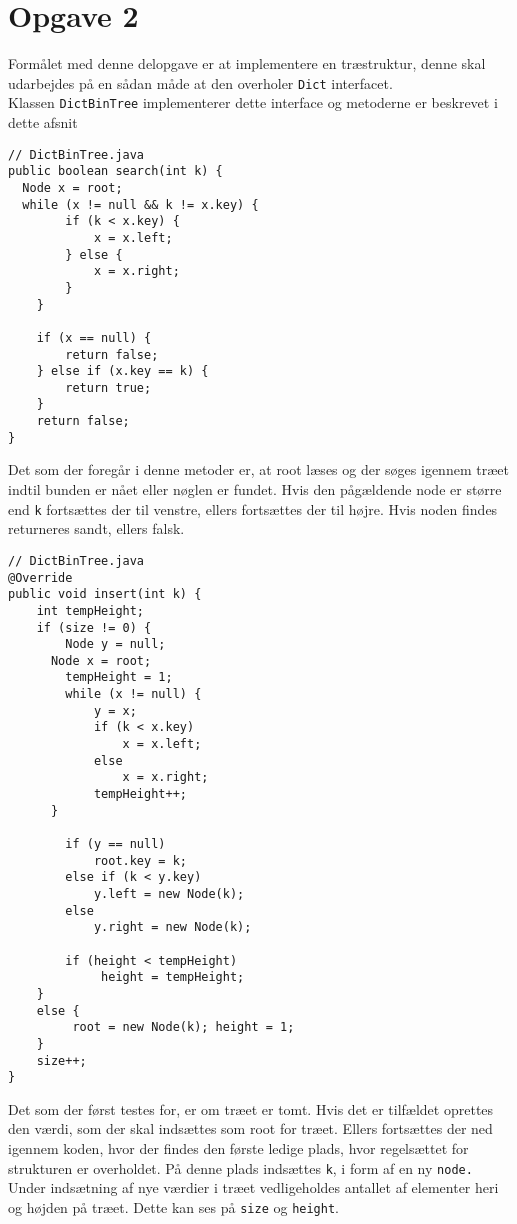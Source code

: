 \documentclass{article}
\begin{document}
\section*{Opgave 2}
Formålet med denne delopgave er at implementere en træstruktur, denne skal udarbejdes på en sådan måde at den overholer \texttt{Dict} interfacet.\\
Klassen \texttt{DictBinTree} implementerer dette interface og metoderne er beskrevet i dette afsnit
\begin{lstlisting}
// DictBinTree.java
public boolean search(int k) {
  Node x = root;
  while (x != null && k != x.key) {
        if (k < x.key) {
            x = x.left;
        } else {
            x = x.right;
        }
    }

    if (x == null) {
        return false;
    } else if (x.key == k) {
        return true;
    }
    return false;
}
\end{lstlisting}
\bigskip
Det som der foregår i denne metoder er, at root læses og der søges igennem træet indtil bunden er nået eller nøglen er fundet. Hvis den pågældende node er større end \texttt{k} fortsættes der til venstre, ellers fortsættes der til højre. Hvis noden findes returneres sandt, ellers falsk.\\
\newpage
\begin{lstlisting}
// DictBinTree.java
@Override
public void insert(int k) {
	int tempHeight;
	if (size != 0) {
		Node y = null;
      Node x = root;
		tempHeight = 1;
		while (x != null) {
			y = x;
			if (k < x.key)
				x = x.left;
			else
				x = x.right;			
			tempHeight++;
      }
		
		if (y == null)
			root.key = k;
		else if (k < y.key)
			y.left = new Node(k);
		else
			y.right = new Node(k);		
            
		if (height < tempHeight)
			 height = tempHeight;		
	}
	else {
		 root = new Node(k); height = 1;
	}
	size++;
}
\end{lstlisting}
\bigskip
Det som der først testes for, er om træet er tomt. Hvis det er tilfældet oprettes den værdi, som der skal indsættes som root for træet. Ellers fortsættes der ned igennem koden, hvor der findes den første ledige plads, hvor regelsættet for strukturen er overholdet. På denne plads indsættes \texttt{k}, i form af en ny \texttt{node.}\\
Under indsætning af nye værdier i træet vedligeholdes antallet af elementer heri og højden på træet. Dette kan ses på \texttt{size} og \texttt{height}.
\end{document}
